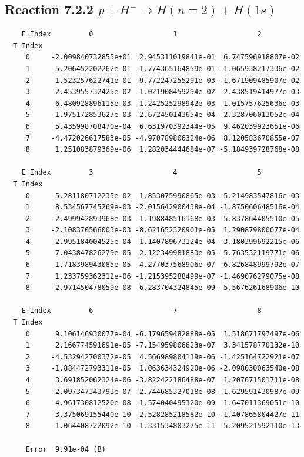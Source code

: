 \documentclass[12pt,dvipdfmx]{article}
\begin{document}
\newpage
\subsection{
Reaction 7.2.2 $   p + H^- \rightarrow H(n=2) + H(1s)$}


\begin{small}\begin{verbatim}
    E Index         0                   1                   2
  T Index
     0     -2.009840732855e+01  2.945311019841e-01  6.747596918807e-02
     1      5.206452202262e-01 -1.774365164859e-01 -1.065938217336e-02
     2      1.523257622741e-01  9.772247255291e-03 -1.671909485907e-02
     3      2.453955732425e-02  1.021908459294e-02  2.438519414977e-03
     4     -6.480928896115e-03 -1.242525298942e-03  1.015757625636e-03
     5     -1.975172853627e-03 -2.672450143654e-04 -2.328706013052e-04
     6      5.435998708470e-04  6.631970392344e-05  9.462039923651e-06
     7     -4.472026617583e-05 -4.970789806324e-06  8.120583670855e-07
     8      1.251083879369e-06  1.282034444684e-07 -5.184939728768e-08

    E Index         3                   4                   5
  T Index
     0      5.281180712235e-02  1.853075990865e-03 -5.214983547816e-03
     1      8.534567745269e-03 -2.015642900438e-04 -1.875060648516e-04
     2     -2.499942893968e-03  1.198848516168e-03  5.837864405510e-05
     3     -2.108370566003e-03 -8.621652320901e-05  1.290879800077e-04
     4      2.995184004525e-04 -1.140789673124e-04 -3.180399692215e-06
     5      7.043847826279e-05  2.122349981883e-05 -5.763532119771e-06
     6     -1.718398943085e-05 -4.277037568906e-07  6.826848999792e-07
     7      1.233759362312e-06 -1.215395288499e-07 -1.469076279075e-08
     8     -2.971450478059e-08  6.283704324845e-09 -5.567626168906e-10

    E Index         6                   7                   8
  T Index
     0      9.106146930077e-04 -6.179659482888e-05  1.518671797497e-06
     1      2.166774591691e-05 -7.154959806623e-07  3.341578770132e-10
     2     -4.532942700372e-05  4.566989804119e-06 -1.425164722921e-07
     3     -1.884472793311e-05  1.063634324920e-06 -2.098030063540e-08
     4      3.691852062324e-06 -3.822422186488e-07  1.207671501711e-08
     5      2.097347343793e-07  2.744685327018e-08 -1.629591430987e-09
     6     -4.961730812520e-08 -1.574040495320e-09  1.647011369051e-10
     7      3.375069155440e-10  2.528285218582e-10 -1.407865804427e-11
     8      1.064408722092e-10 -1.331534803275e-11  5.209521592110e-13

     Error  9.91e-04 (B)
\end{verbatim}\end{small}
\end{document}
